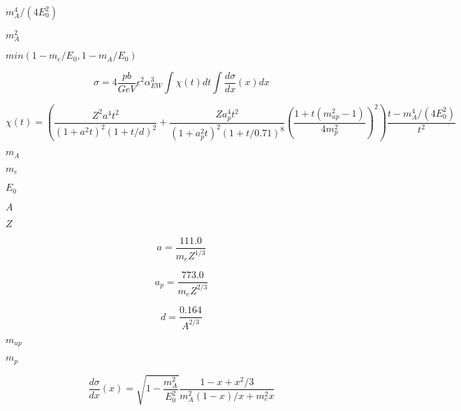 \documentclass{article}
\begin{document}
$m_A^4/(4E_0^2)$
\pagebreak

$m_A^2$
\pagebreak

$min(1-m_e/E_0,1-m_A/E_0)$
\pagebreak

\[ \sigma = 4 \frac{pb}{GeV} \epsilon^2 \alpha_{EW}^3 \int \chi(t)dt \int \frac{d\sigma}{dx}(x)dx \]
\pagebreak

\[ \chi(t) = \left( \frac{Z^2a^4t^2}{(1+a^2t)^2(1+t/d)^2}+\frac{Za_p^4t^2}{(1+a_p^2t)^2(1+t/0.71)^8}\left(\frac{1+t(m_{up}^2-1)}{4m_p^2}\right)^2\right)\frac{t-m_A^4/(4E_0^2)}{t^2} \]
\pagebreak

$m_A$
\pagebreak

$m_e$
\pagebreak

$E_0$
\pagebreak

$A$
\pagebreak

$Z$
\pagebreak

\[a = \frac{111.0}{m_e Z^{1/3}}\]
\pagebreak

\[a_p = \frac{773.0}{m_e Z^{2/3}}\]
\pagebreak

\[d = \frac{0.164}{A^{2/3}}\]
\pagebreak

$m_{up}$
\pagebreak

$m_{p}$
\pagebreak

\[ \frac{d\sigma}{dx}(x) = \sqrt{1-\frac{m_A^2}{E_0^2}}\frac{1-x+x^2/3}{m_A^2(1-x)/x+m_e^2x} \]
\pagebreak
\end{document}
